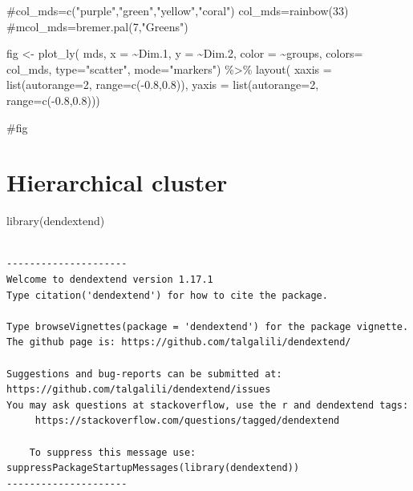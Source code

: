 \documentclass[
  letterpaper,
  DIV=11,
  numbers=noendperiod]{scrreprt}
\newenvironment{Shaded}{\begin{snugshade}}{\end{snugshade}}
\newcommand{\AttributeTok}[1]{\textcolor[rgb]{0.40,0.45,0.13}{#1}}
\newcommand{\CommentTok}[1]{\textcolor[rgb]{0.37,0.37,0.37}{#1}}
\newcommand{\DecValTok}[1]{\textcolor[rgb]{0.68,0.00,0.00}{#1}}
\newcommand{\FloatTok}[1]{\textcolor[rgb]{0.68,0.00,0.00}{#1}}
\newcommand{\FunctionTok}[1]{\textcolor[rgb]{0.28,0.35,0.67}{#1}}
\newcommand{\NormalTok}[1]{\textcolor[rgb]{0.00,0.23,0.31}{#1}}
\newcommand{\OtherTok}[1]{\textcolor[rgb]{0.00,0.23,0.31}{#1}}
\newcommand{\SpecialCharTok}[1]{\textcolor[rgb]{0.37,0.37,0.37}{#1}}
\newcommand{\StringTok}[1]{\textcolor[rgb]{0.13,0.47,0.30}{#1}}
\begin{document}
\begin{Shaded}
\begin{Highlighting}[]
\CommentTok{\#col\_mds=c("purple","green","yellow","coral")}
\NormalTok{col\_mds}\OtherTok{=}\FunctionTok{rainbow}\NormalTok{(}\DecValTok{33}\NormalTok{)}
\CommentTok{\#mcol\_mds=bremer.pal(7,"Greens")}

\NormalTok{fig }\OtherTok{\textless{}{-}} 
\FunctionTok{plot\_ly}\NormalTok{(}
\NormalTok{  mds, }\AttributeTok{x =} \SpecialCharTok{\textasciitilde{}}\NormalTok{Dim}\FloatTok{.1}\NormalTok{, }\AttributeTok{y =} \SpecialCharTok{\textasciitilde{}}\NormalTok{Dim}\FloatTok{.2}\NormalTok{,}
  \AttributeTok{color =} \SpecialCharTok{\textasciitilde{}}\NormalTok{groups, }
  \AttributeTok{colors=}\NormalTok{ col\_mds,}
  \AttributeTok{type=}\StringTok{"scatter"}\NormalTok{,}
  \AttributeTok{mode=}\StringTok{"markers"}\NormalTok{) }\SpecialCharTok{\%\textgreater{}\%}
  \FunctionTok{layout}\NormalTok{(}
    \AttributeTok{xaxis =} \FunctionTok{list}\NormalTok{(}\AttributeTok{autorange=}\DecValTok{2}\NormalTok{,}
      \AttributeTok{range=}\FunctionTok{c}\NormalTok{(}\SpecialCharTok{{-}}\FloatTok{0.8}\NormalTok{,}\FloatTok{0.8}\NormalTok{)), }\AttributeTok{yaxis =} \FunctionTok{list}\NormalTok{(}\AttributeTok{autorange=}\DecValTok{2}\NormalTok{,}
      \AttributeTok{range=}\FunctionTok{c}\NormalTok{(}\SpecialCharTok{{-}}\FloatTok{0.8}\NormalTok{,}\FloatTok{0.8}\NormalTok{)))}


\CommentTok{\#fig}
\end{Highlighting}
\end{Shaded}


\hypertarget{hierarchical-cluster}{%
\chapter{Hierarchical cluster}\label{hierarchical-cluster}}

\begin{Shaded}
\begin{Highlighting}[]
\FunctionTok{library}\NormalTok{(dendextend)}
\end{Highlighting}
\end{Shaded}

\begin{verbatim}

---------------------
Welcome to dendextend version 1.17.1
Type citation('dendextend') for how to cite the package.

Type browseVignettes(package = 'dendextend') for the package vignette.
The github page is: https://github.com/talgalili/dendextend/

Suggestions and bug-reports can be submitted at: https://github.com/talgalili/dendextend/issues
You may ask questions at stackoverflow, use the r and dendextend tags: 
     https://stackoverflow.com/questions/tagged/dendextend

    To suppress this message use:  suppressPackageStartupMessages(library(dendextend))
---------------------
\end{verbatim}
\end{document}
